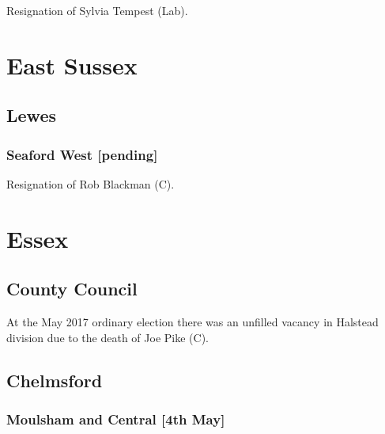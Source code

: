\documentclass[a4paper,openany]{book}
\begin{document}
\begin{resultsiii}

Resignation of Sylvia Tempest (Lab).

\section{East Sussex}

\subsection*{Lewes}

\subsubsection*{Seaford West \hspace*{\fill}\nolinebreak[1]%
\enspace\hspace*{\fill}
[pending]}


Resignation of Rob Blackman (C).

\section{Essex}

\subsection*{County Council}

At the May 2017 ordinary election there was an unfilled vacancy in Halstead division due to the death of Joe Pike (C).

\subsection*{Chelmsford}

\subsubsection*{Moulsham and Central \hspace*{\fill}\nolinebreak[1]%
\enspace\hspace*{\fill}
[4th May]}



\end{resultsiii}
\end{document}

